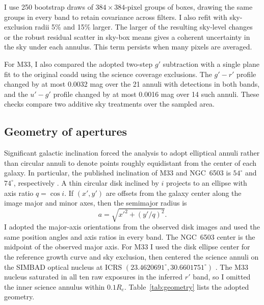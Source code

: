 I use 250 bootstrap draws of $384\times384$-pixel groups of boxes, drawing the same groups in every band to retain covariance across filters. I also refit with sky-exclusion radii 5\% and 15\% larger. The larger of the resulting sky-level changes or the robust residual scatter in sky-box means gives a coherent uncertainty in the sky under each annulus. This term persists when many pixels are averaged.

For M33, I also compared the adopted two-step $g'$ subtraction with a single plane fit to the original coadd using the science coverage exclusions. The $g'-r'$ profile changed by at most 0.0032 mag over the 21 annuli with detections in both bands, and the $u'-g'$ profile changed by at most 0.0016 mag over 14 such annuli. These checks compare two additive sky treatments over the sampled area.

\subsection{Geometry of apertures}
\label{sec:geometry}

Significant galactic inclination forced the analysis to adopt elliptical annuli rather than circular annuli to denote points roughly equidistant from the center of each galaxy. In particular, the published inclination of M33 and NGC~6503 is $54^{\circ}$ and $74^{\circ}$, respectively \citep{methCorbelli,methBottema}. A thin circular disk inclined by $i$ projects to an ellipse with axis ratio $q=\cos i$. If $(x',y')$ are offsets from the galaxy center along the image major and minor axes, then the semimajor radius is
\begin{equation}
    a=\sqrt{x'^2+(y'/q)^2}.
    \label{eq:ellipse}
\end{equation}
I adopted the major-axis orientations from the observed disk images and used the same position angles and axis ratios in every band. The NGC~6503 center is the midpoint of the observed major axis. For M33 I used the disk ellipse center for the reference growth curve and sky exclusion, then centered the science annuli on the SIMBAD optical nucleus at ICRS $(23.4620691^{\circ},30.6601751^{\circ})$ \citep{methSIMBAD}. The M33 nucleus saturated in all ten raw exposures in the inferred $r'$ band, so I omitted the inner science annulus within $0.1R_e$. Table~\ref{tab:geometry} lists the adopted geometry.

